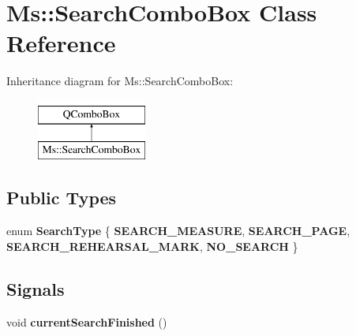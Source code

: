 \hypertarget{class_ms_1_1_search_combo_box}{}\section{Ms\+:\+:Search\+Combo\+Box Class Reference}
\label{class_ms_1_1_search_combo_box}
Inheritance diagram for Ms\+:\+:Search\+Combo\+Box\+:\begin{figure}[H]
\begin{center}
\leavevmode
\includegraphics[height=2.000000cm]{class_ms_1_1_search_combo_box}
\end{center}
\end{figure}
\subsection*{Public Types}
\begin{DoxyCompactItemize}
\item 
\mbox{\label{class_ms_1_1_search_combo_box_a4a41a667864b37d2a38b98b3701b5d34}} 
enum {\bfseries Search\+Type} \{ {\bfseries S\+E\+A\+R\+C\+H\+\_\+\+M\+E\+A\+S\+U\+RE}, 
{\bfseries S\+E\+A\+R\+C\+H\+\_\+\+P\+A\+GE}, 
{\bfseries S\+E\+A\+R\+C\+H\+\_\+\+R\+E\+H\+E\+A\+R\+S\+A\+L\+\_\+\+M\+A\+RK}, 
{\bfseries N\+O\+\_\+\+S\+E\+A\+R\+CH}
 \}
\end{DoxyCompactItemize}
\subsection*{Signals}
\begin{DoxyCompactItemize}
\item 
\mbox{\label{class_ms_1_1_search_combo_box_a85286cf0ab0e8829ef87523380b7b897}} 
void {\bfseries current\+Search\+Finished} ()
\end{DoxyCompactItemize}
